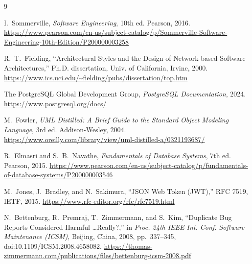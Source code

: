 \documentclass[11pt]{report}
\begin{document}
\begin{thebibliography}{9}

I.~Sommerville, \emph{Software Engineering}, 10th ed. Pearson, 2016.
\url{https://www.pearson.com/en-us/subject-catalog/p/Sommerville-Software-Engineering-10th-Edition/P200000003258}

R.~T.~Fielding, ``Architectural Styles and the Design of Network-based
Software Architectures,'' Ph.D. dissertation, Univ. of California,
Irvine, 2000.
\url{https://www.ics.uci.edu/~fielding/pubs/dissertation/top.htm}

The PostgreSQL Global Development Group, \emph{PostgreSQL Documentation},
2024.
\url{https://www.postgresql.org/docs/}

M.~Fowler, \emph{UML Distilled: A Brief Guide to the Standard Object
Modeling Language}, 3rd ed. Addison-Wesley, 2004.
\url{https://www.oreilly.com/library/view/uml-distilled-a/0321193687/}

R.~Elmasri and S.~B.~Navathe, \emph{Fundamentals of Database Systems},
7th ed. Pearson, 2015.
\url{https://www.pearson.com/en-us/subject-catalog/p/fundamentals-of-database-systems/P200000003546}

M.~Jones, J.~Bradley, and N.~Sakimura, ``JSON Web Token (JWT),'' RFC 7519,
IETF, 2015.
\url{https://www.rfc-editor.org/rfc/rfc7519.html}

N.~Bettenburg, R.~Premraj, T.~Zimmermann, and S.~Kim, ``Duplicate Bug
Reports Considered Harmful \dots Really?,'' in \emph{Proc. 24th IEEE
Int. Conf. Software Maintenance (ICSM)}, Beijing, China, 2008,
pp.~337--345, doi:10.1109/ICSM.2008.4658082.
\url{https://thomas-zimmermann.com/publications/files/bettenburg-icsm-2008.pdf}

\end{thebibliography}
\end{document}
